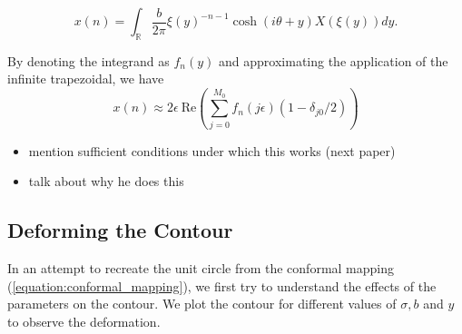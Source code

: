 \documentclass[a4paper]{report}
\begin{document}
\begin{equation}
    x(n) = \int_\mathbb{R} \frac{b}{2\pi} \xi(y)^{-n-1} \cosh(i\theta + y) X(\xi(y)) dy.
\end{equation}

By denoting the integrand as $f_n(y)$ and approximating the application of the infinite trapezoidal, we have 
\begin{equation}
    x(n) \approx 2 \epsilon\ \text{Re}\left( \sum_{j = 0}^{M_0} f_n(j \epsilon)(1 - \delta_{j0}/2) \right)
\end{equation}


\begin{itemize}
    \item mention sufficient conditions under which this works (next paper)
    \item talk about why he does this
\end{itemize}

\subsection{Deforming the Contour}
In an attempt to recreate the unit circle from the conformal mapping (\ref{equation:conformal_mapping}), we first try to understand the effects of the parameters on the contour. We plot the contour for different values of $\sigma, b$ and $y$ to observe the deformation.
\end{document}
